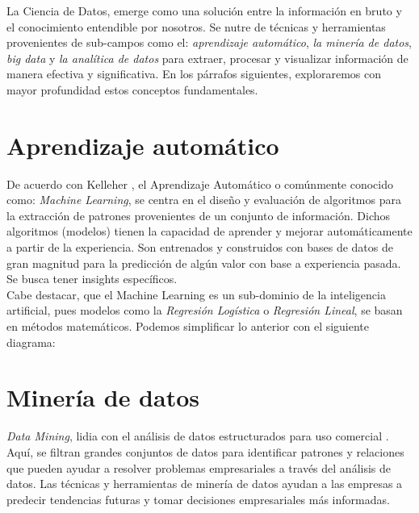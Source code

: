 \documentclass[12pt]{article}
\begin{document}
La Ciencia de Datos, emerge como una solución entre la información en bruto y el conocimiento entendible por nosotros. Se nutre de técnicas y herramientas provenientes de sub-campos como el: \emph{aprendizaje automático}, \emph{la minería de datos}, \emph{big data} y \emph{la analítica de datos} para extraer, procesar y visualizar información de manera efectiva y significativa. En los párrafos siguientes, exploraremos con mayor profundidad estos conceptos fundamentales.\\

\section{Aprendizaje automático}
De acuerdo con Kelleher \cite{1}, el Aprendizaje Automático o comúnmente conocido como: \emph{Machine Learning}, se centra en el diseño y evaluación de algoritmos para la extracción de patrones provenientes de un conjunto de información. Dichos algoritmos (modelos) tienen la capacidad de aprender y mejorar automáticamente a partir de la experiencia. Son entrenados y construidos con bases de datos de gran magnitud para la predicción de algún valor con base a experiencia pasada. Se busca tener insights específicos.\\

Cabe destacar, que el Machine Learning es un sub-dominio de la inteligencia artificial, pues modelos como la \emph{Regresión Logística} o \emph{Regresión Lineal}, se basan en métodos matemáticos. Podemos simplificar lo anterior con el siguiente diagrama:\\

\begin{figure}[h]
\end{figure}

\section{Minería de datos}
\emph{Data Mining}, lidia con el análisis de datos estructurados para uso comercial \cite{1}. Aquí, se filtran grandes conjuntos de datos para identificar patrones y relaciones que pueden ayudar a resolver problemas empresariales a través del análisis de datos. Las técnicas y herramientas de minería de datos ayudan a las empresas a predecir tendencias futuras y tomar decisiones empresariales más informadas.\\
\end{document}
